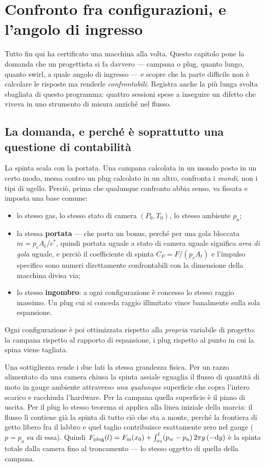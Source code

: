 \chapter{Confronto fra configurazioni, e l'angolo di ingresso}
\label{ch:compare}

Tutto fin qui ha certificato una macchina alla volta. Questo capitolo
pone la domanda che un progettista si fa davvero --- campana o plug,
quanto lungo, quanto swirl, a quale angolo di ingresso --- e scopre
che la parte difficile non è calcolare le risposte ma renderle
\emph{confrontabili}. Registra anche la più lunga svolta sbagliata di
questo programma: quattro sessioni spese a inseguire un difetto che
viveva in uno strumento di misura anziché nel flusso.

\section{La domanda, e perché è soprattutto una questione di
contabilità}

La spinta scala con la portata. Una campana calcolata in un mondo
posto in un certo modo, messa contro un plug calcolato in un altro,
confronta i \emph{mondi}, non i tipi di ugello. Perciò, prima che
qualunque confronto abbia senso, va fissata e imposta una base
comune:

\begin{itemize}[itemsep=1pt]
\item lo stesso gas, lo stesso stato di camera $(P_0, T_0)$, lo
  stesso ambiente $p_a$;
\item la stessa \textbf{portata} --- che porta un bonus, perché per
  una gola bloccata $\dot m = p_c A_t/c^{*}$, quindi portata uguale a
  stato di camera uguale significa \emph{area di gola} uguale, e
  perciò il coefficiente di spinta $C_F = F/(p_c A_t)$ e l'impulso
  specifico sono numeri direttamente confrontabili con la dimensione
  della macchina divisa via;
\item lo stesso \textbf{ingombro}: a ogni configurazione è concesso
  lo stesso raggio massimo. Un plug cui si conceda raggio illimitato
  vince banalmente sulla sola espansione.
\end{itemize}

Ogni configurazione è poi ottimizzata rispetto alla \emph{propria}
variabile di progetto: la campana rispetto al rapporto di espansione,
i plug rispetto al punto in cui la spina viene tagliata.

Una sottigliezza rende i due lati la stessa grandezza fisica. Per un
razzo alimentato da una camera chiusa la spinta assiale eguaglia il
flusso di quantità di moto in gauge ambiente attraverso \emph{una
qualunque} superficie che copra l'intero scarico e racchiuda
l'hardware. Per la campana quella superficie è il piano di uscita.
Per il plug lo stesso teorema si applica alla linea iniziale della
marcia: il flusso lì contiene già la spinta di tutto ciò che sta a
monte, perché la frontiera di getto libero fra il labbro e quel
taglio contribuisce esattamente zero nel gauge ($p = p_a$ su di
essa). Quindi
$F_{\rm plug}(l) = F_{\rm in}(x_0) + \int_{x_0}^{l}(p_w - p_a)\,
2\pi y\,(-\mathrm{d}y)$ è la spinta totale dalla camera fino al
troncamento --- lo stesso oggetto di quella della campana.

